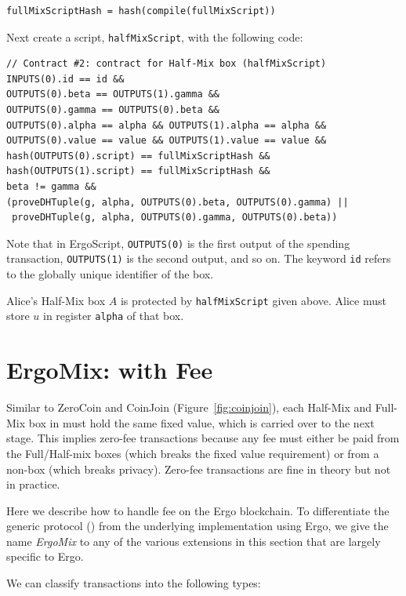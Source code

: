 \documentclass[runningheads]{llncs}
\newcommand{\langname}{ErgoScript\xspace}
\newcommand{\mixname}{ErgoMix\xspace}
\begin{document}
{\small
\begin{verbatim}
fullMixScriptHash = hash(compile(fullMixScript))
\end{verbatim}
}
Next create a script, \texttt{halfMixScript}, with the following code:
{\small
\begin{Verbatim}[frame=single]
// Contract #2: contract for Half-Mix box (halfMixScript)
INPUTS(0).id == id &&
OUTPUTS(0).beta == OUTPUTS(1).gamma && 
OUTPUTS(0).gamma == OUTPUTS(0).beta && 
OUTPUTS(0).alpha == alpha && OUTPUTS(1).alpha == alpha &&
OUTPUTS(0).value == value && OUTPUTS(1).value == value &&
hash(OUTPUTS(0).script) == fullMixScriptHash &&  
hash(OUTPUTS(1).script) == fullMixScriptHash &&
beta != gamma &&
(proveDHTuple(g, alpha, OUTPUTS(0).beta, OUTPUTS(0).gamma) || 
 proveDHTuple(g, alpha, OUTPUTS(0).gamma, OUTPUTS(0).beta))
\end{Verbatim}
}

Note that in \langname, \texttt{OUTPUTS(0)} is the first output of the spending transaction, \texttt{OUTPUTS(1)} is the second output, and so on. The keyword \texttt{id} refers to the globally unique identifier of the box. 

Alice's Half-Mix box $A$ is protected by \texttt{halfMixScript} given above. Alice must store $u$ in register \texttt{alpha} of that box.


\section{\mixname: \algname with Fee}
\label{fee}

Similar to ZeroCoin and CoinJoin (Figure~\ref{fig:coinjoin}), each Half-Mix and Full-Mix box in \algname must hold the same fixed value, which is carried over to the next stage. This implies zero-fee transactions because any fee must either be paid from the Full/Half-mix boxes (which breaks the fixed value requirement) or from a non-\algname box (which breaks privacy). Zero-fee transactions are fine in theory but not in practice. %

Here we describe how to handle fee on the Ergo blockchain. To differentiate the generic protocol (\algname) from the underlying implementation using Ergo, we give the name {\em \mixname} to any of the various extensions in this section that are largely specific to Ergo. 

We can classify \algname transactions into the following types:
\end{document}
